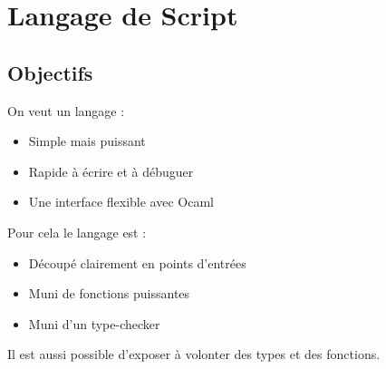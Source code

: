\documentclass[french,xcolor={usenames,dvipsnames}]{beamer}
\begin{document}
\section{Langage de Script}

\subsection{Objectifs}

\begin{frame}
  On veut un langage : 
  \vspace{10pt}
  \begin{itemize}
    \item Simple mais puissant

    \vspace{10pt}

    \item Rapide à écrire et à débuguer

    \vspace{10pt}

    \item Une interface flexible avec Ocaml
  \end{itemize}
\end{frame}

\begin{frame}
  Pour cela le langage est :
  \vspace{10pt}
  \begin{itemize}
    \item Découpé clairement en points d'entrées 

    \vspace{10pt}

    \item Muni de fonctions puissantes

    \vspace{10pt}

    \item Muni d'un type-checker
  \end{itemize}

  \vspace{10pt}

  Il est aussi possible d'exposer à volonter des types et des fonctions.
\end{frame}
\end{document}
